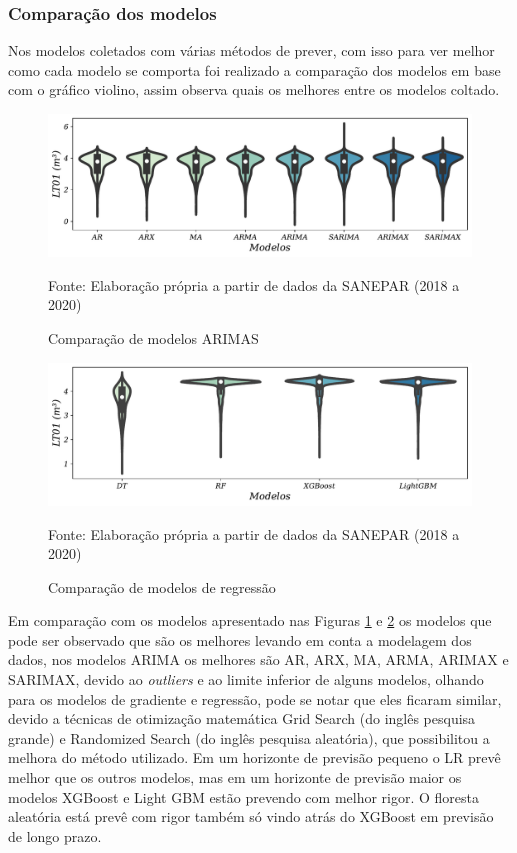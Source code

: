  \subsubsection{Compara\c c\~ao dos modelos}
 Nos modelos coletados com várias métodos de prever, com isso para ver melhor como cada modelo se comporta foi realizado a comparação dos modelos em base com o gráfico violino, assim observa quais os melhores entre os modelos coltado.
 
 \begin{figure}[H]
 	\centering
 	\caption{Comparação de modelos ARIMAS}
 	\includegraphics[width=1\linewidth]{Resultados/Figuras/modelos-arima}
 	
 	\label{fig:modelos-arima}
 	
 	Fonte: Elaboração própria a partir de dados da SANEPAR (2018 a 2020)
 \end{figure}
 
 
 \begin{figure}[H]
 	\centering
 	\caption{Comparação de modelos de regressão }
 	\includegraphics[width=1\linewidth]{Resultados/Figuras/violin-LR-XGB-LGBM-RF}
 	
 	\label{fig:violin-lr-xgb-lgbm-rf}
 	
 	Fonte: Elaboração própria a partir de dados da SANEPAR (2018 a 2020)
 \end{figure}


Em comparação com os modelos apresentado nas Figuras \ref{fig:modelos-arima} e \ref{fig:violin-lr-xgb-lgbm-rf} os modelos que pode ser observado que são os melhores levando em conta a modelagem dos dados, nos modelos ARIMA os melhores são AR, ARX, MA, ARMA, ARIMAX e SARIMAX, devido ao \textit{outliers} e ao limite inferior de alguns modelos, olhando para os modelos de gradiente e regressão, pode se notar que eles ficaram similar, devido a técnicas de otimização matemática Grid Search (do inglês pesquisa grande) e Randomized Search (do inglês pesquisa aleatória), que possibilitou a melhora do método utilizado. Em um horizonte de previsão pequeno o LR prevê melhor que os outros modelos, mas em um horizonte de previsão maior os modelos XGBoost e Light GBM estão prevendo com melhor rigor. O floresta aleatória está prevê com rigor também só vindo atrás do XGBoost em previsão de longo prazo.

